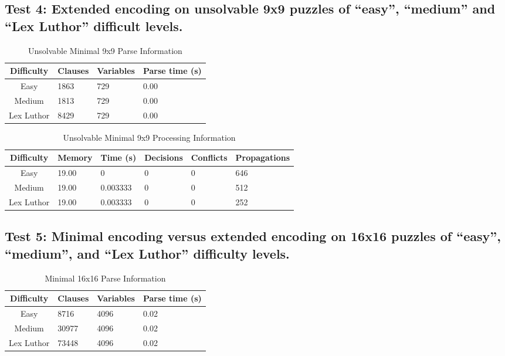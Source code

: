 \documentclass[conference,draftclsnofoot]{IEEEtran}
\begin{document}
\subsection{Test 4: Extended encoding on unsolvable 9x9 puzzles of ``easy'',
``medium'' and ``Lex Luthor'' difficult levels.}

\begin{table}[!h]
	\centering
	\begin{tabular}{c | l l l}
		Difficulty & Clauses & Variables & Parse time (s) \\\hline
		Easy 		& 1863 & 729 & 0.00 \\
		Medium 		& 1813 & 729 & 0.00 \\
		Lex Luthor 	& 8429 & 729 & 0.00
	\end{tabular}
	\caption{Unsolvable Minimal 9x9 Parse Information}

	\label{tab:summary}
\end{table}

\begin{table}[!h]
	\centering
	\begin{tabular}{c | l l p{20pt} p{20pt}  l }
		Difficulty & Memory & Time (s) & Decisions &
		Conflicts & Propagations \\\hline
		Easy 		& 19.00 & 0 & 0  & 0  & 646 \\
		Medium 		& 19.00 & 0.003333 & 0 & 0  & 512 \\
		Lex Luthor 	& 19.00 & 0.003333 & 0 & 0 & 252
	\end{tabular}
	\caption{Unsolvable Minimal 9x9 Processing Information}
	\label{tab:summary}
\end{table} 

\subsection{Test 5: Minimal encoding versus extended encoding on 16x16 puzzles of
``easy'', ``medium'', and ``Lex Luthor'' difficulty levels.}
\begin{table}[!h]
	\centering
	\begin{tabular}{c | l l l}
		Difficulty & Clauses & Variables & Parse time (s) \\\hline
		Easy	& 8716 & 4096 & 0.02\\
		Medium 	& 30977 & 4096 & 0.02\\
		Lex Luthor & 73448 & 4096 & 0.02\\
	\end{tabular}
	\caption{Minimal 16x16 Parse Information}
	\label{tab:summary}
\end{table}
\end{document}
